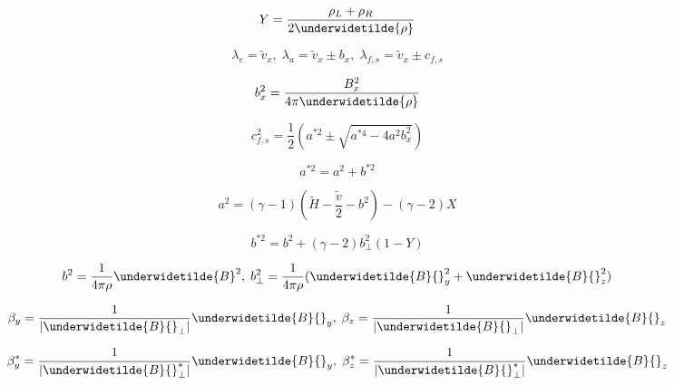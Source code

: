 \begin{equation}
Y = \frac{\rho_{L} + \rho_{R}}{2 \underwidetilde{\rho}}
\vspace{-8pt} 
\end{equation}

\newpage

\begin{equation}
\lambda_{e} = \widetilde{v}_{x}, \; 
\lambda_{a} = \widetilde{v}_{x} \pm b_{x} , \; 
\lambda_{f,s} = \widetilde{v}_{x} \pm c_{f,s}
\end{equation}

\begin{equation}
b_{x}^2 = \frac{B_{x}^2}{4 \pi \underwidetilde{\rho}}
\vspace{-8pt} 
\end{equation}

\begin{equation}
c_{f,s}^2 = \frac12 \left( a^{\ast 2} \pm \sqrt{a^{\ast 4} 
- 4 a^2 b_x^2}\right)
\end{equation}

\begin{equation}
a^{\ast 2} = a^2 + b^{\ast 2}
\end{equation}

\begin{equation}
a^2 = \left(\gamma -1 \right) \left(\widetilde{H} - \frac{\widetilde{v}}{2} 
- b^2 \right) - \left(\gamma -2 \right) X
\end{equation}

\begin{equation}
b^{\ast 2} = b^2 + \left( \gamma -2 \right) b_{\bot}^2 \left( 1 - Y \right)
\end{equation}

\begin{equation}
b^2 = \frac1{4 \pi \rho} \underwidetilde{B}^2, \;
b_{\bot}^2 = \frac1{4 \pi \rho} ( \underwidetilde{B}{}_{y}^2 + 
\underwidetilde{B}{}_{z}^2 )
\end{equation}

\newpage

\begin{equation}
\beta_{y} = \frac1{| \underwidetilde{B}{}_{\bot} |} \underwidetilde{B}{}_{y}
, \;
\beta_{z} = \frac1{| \underwidetilde{B}{}_{\bot} |} \underwidetilde{B}{}_{z}
\vspace{-8pt}
\end{equation}

\begin{equation}
\beta_{y}^{\ast} = \frac1{| \underwidetilde{B}{}^{\ast}_{\bot} |} \underwidetilde{B}{}_{y}
, \;
\beta_{z}^{\ast} = \frac1{| \underwidetilde{B}{}^{\ast}_{\bot} |} \underwidetilde{B}{}_{z}
\vspace{-8pt}
\end{equation}

